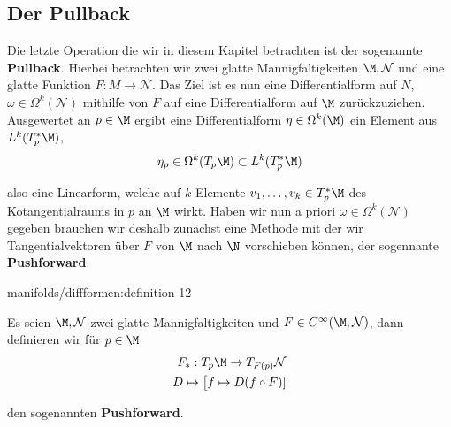 \documentclass[letterpaper,10pt,english]{jupyterBook}
\begin{document}
\subsection{Der Pullback}
\label{\detokenize{manifolds/diffformen:der-pullback}}
\par
Die letzte Operation die wir in diesem Kapitel betrachten ist der sogenannte \textbf{Pullback}. Hierbei betrachten wir zwei glatte Mannigfaltigkeiten \(\M,\mathcal{N}\) und eine glatte Funktion \(F:M\to\mathcal{N}\). Das Ziel ist es nun eine Differentialform auf \(N\), \(\omega\in\Omega^k(\mathcal{N})\) mithilfe von \(F\) auf eine Differentialform auf \(\M\) zurückzuziehen. Ausgewertet an \(p\in\M\) ergibt eine Differentialform \(\eta\in\Omega^k(\M)\) ein Element aus \(L^k(T_p^\ast\M)\),
\begin{align*}
\eta_p\in \Omega^k(T_p\M) \subset L^k(T_p^\ast\M)
\end{align*}
\par
also eine Linearform, welche auf \(k\) Elemente \(v_1,\ldots,v_k\in T_p^\ast\M\) des Kotangentialraums in \(p\) an \(\M\) wirkt. Haben wir nun a priori \(\omega\in\Omega^k(\mathcal{N})\) gegeben brauchen wir deshalb zunächst eine Methode mit der wir Tangentialvektoren über \(F\) von \(\M\) nach \(\N\) vorschieben können, der sogennante \textbf{Pushforward}.
\begin{definition}{}{manifolds/diffformen:definition-12}



\par
Es seien \(\M,\mathcal{N}\) zwei glatte Mannigfaltigkeiten und \(F\in C^\infty(\M,\mathcal{N})\), dann definieren wir für \(p\in\M\)
\begin{align*}
F_\ast:T_p\M\to T_{F(p)}\mathcal{N}\\
D\mapsto \big[f\mapsto D(f\circ F)]
\end{align*}
\par
den sogenannten \textbf{Pushforward}.
\end{definition}
\end{document}
